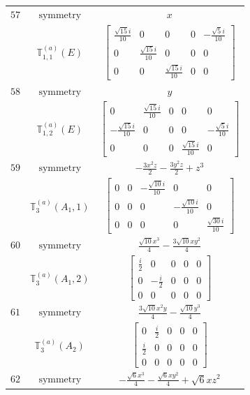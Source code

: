 \documentclass[fleqn,8pt,landscape]{jsarticle}
\begin{document}
\begin{longtable}{ccc}
$ 57 $ & $ \text{symmetry} $ & $ x $ \\
$  $ & $ \mathbb{T}_{1,1}^{(a)}(E) $ & $ \begin{bmatrix} \frac{\sqrt{15} i}{10} & 0 & 0 & 0 & - \frac{\sqrt{5} i}{10} \\ 0 & \frac{\sqrt{15} i}{10} & 0 & 0 & 0 \\ 0 & 0 & \frac{\sqrt{15} i}{10} & 0 & 0 \end{bmatrix} $ \\ \hline
$ 58 $ & $ \text{symmetry} $ & $ y $ \\
$  $ & $ \mathbb{T}_{1,2}^{(a)}(E) $ & $ \begin{bmatrix} 0 & \frac{\sqrt{15} i}{10} & 0 & 0 & 0 \\ - \frac{\sqrt{15} i}{10} & 0 & 0 & 0 & - \frac{\sqrt{5} i}{10} \\ 0 & 0 & 0 & \frac{\sqrt{15} i}{10} & 0 \end{bmatrix} $ \\ \hline
$ 59 $ & $ \text{symmetry} $ & $ - \frac{3 x^{2} z}{2} - \frac{3 y^{2} z}{2} + z^{3} $ \\
$  $ & $ \mathbb{T}_{3}^{(a)}(A_{1},1) $ & $ \begin{bmatrix} 0 & 0 & - \frac{\sqrt{10} i}{10} & 0 & 0 \\ 0 & 0 & 0 & - \frac{\sqrt{10} i}{10} & 0 \\ 0 & 0 & 0 & 0 & \frac{\sqrt{30} i}{10} \end{bmatrix} $ \\ \hline
$ 60 $ & $ \text{symmetry} $ & $ \frac{\sqrt{10} x^{3}}{4} - \frac{3 \sqrt{10} x y^{2}}{4} $ \\
$  $ & $ \mathbb{T}_{3}^{(a)}(A_{1},2) $ & $ \begin{bmatrix} \frac{i}{2} & 0 & 0 & 0 & 0 \\ 0 & - \frac{i}{2} & 0 & 0 & 0 \\ 0 & 0 & 0 & 0 & 0 \end{bmatrix} $ \\ \hline
$ 61 $ & $ \text{symmetry} $ & $ \frac{3 \sqrt{10} x^{2} y}{4} - \frac{\sqrt{10} y^{3}}{4} $ \\
$  $ & $ \mathbb{T}_{3}^{(a)}(A_{2}) $ & $ \begin{bmatrix} 0 & \frac{i}{2} & 0 & 0 & 0 \\ \frac{i}{2} & 0 & 0 & 0 & 0 \\ 0 & 0 & 0 & 0 & 0 \end{bmatrix} $ \\ \hline
$ 62 $ & $ \text{symmetry} $ & $ - \frac{\sqrt{6} x^{3}}{4} - \frac{\sqrt{6} x y^{2}}{4} + \sqrt{6} x z^{2} $ \\

\end{longtable}
\end{document}
